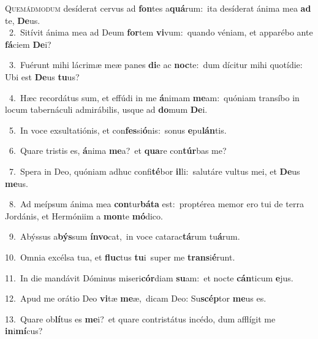 \lettrine{\initial\textcolor{\initialcolor}{Q}}{uemádmodum} desíderat cervus ad \textbf{fon}\-tes a\-\textbf{quá}\-rum:~\star ita desíderat ánima mea \textbf{ad} te, \textbf{De}\-us.\\
{\numbfont\textcolor{\numbcolor}{~2.}}~Sitívit ánima mea ad Deum \textbf{for}\-tem \textbf{vi}\-vum:~\star quando véniam, et apparébo ante \textbf{fá}\-ciem \textbf{De}\-i?\par
{\numbfont\textcolor{\numbcolor}{~3.}}~Fuérunt mihi lácrimæ meæ panes \textbf{di}\-e ac \textbf{noc}\-te:~\star dum dícitur mihi quotídie: Ubi est \textbf{De}\-us \textbf{tu}\-us?\par
{\numbfont\textcolor{\numbcolor}{~4.}}~Hæc recordátus sum, et effúdi in me \textbf{á}\-nimam \textbf{me}\-am:~\star quóniam transíbo in locum tabernáculi admirábilis, usque ad \textbf{do}\-mum \textbf{De}\-i.\par
{\numbfont\textcolor{\numbcolor}{~5.}}~In voce exsultatiónis, et con\-\textbf{fes}\-si\-\textbf{ó}\-nis:~\star sonus \textbf{e}\-pu\-\textbf{lán}\-tis.\par
{\numbfont\textcolor{\numbcolor}{~6.}}~Quare tristis es, \textbf{á}\-nima \textbf{me}\-a?~\star et \textbf{qua}\-re con\-\textbf{túr}\-bas me?\par
{\numbfont\textcolor{\numbcolor}{~7.}}~Spera in Deo, quóniam adhuc confi\-\textbf{té}\-bor \textbf{il}\-li:~\star salutáre vultus mei, et \textbf{De}\-us \textbf{me}\-us.\par
{\numbfont\textcolor{\numbcolor}{~8.}}~Ad meípsum ánima mea \textbf{con}\-tur\-\textbf{bá}\-\textbf{ta} est:~\star proptérea memor ero tui de terra Jordánis, et Hermóniim a \textbf{mon}\-te \textbf{mó}\-dico.\par
{\numbfont\textcolor{\numbcolor}{~9.}}~Abýssus a\-\textbf{býs}\-sum \textbf{ín}\-\textbf{vo}cat,~\star in voce catarac\-\textbf{tá}\-rum tu\-\textbf{á}\-rum.\par
{\numbfont\textcolor{\numbcolor}{10.}}~Omnia excélsa tua, et \textbf{fluc}\-tus \textbf{tu}\-i~\star super me \textbf{trans}\-i\-\textbf{é}\-runt.\par
{\numbfont\textcolor{\numbcolor}{11.}}~In die mandávit Dóminus miseri\-\textbf{cór}\-diam \textbf{su}\-am:~\star et nocte \textbf{cán}\-ticum \textbf{e}\-jus.\par
{\numbfont\textcolor{\numbcolor}{12.}}~Apud me orátio Deo \textbf{vi}\-tæ \textbf{me}\-æ,~\star dicam Deo: Su\-\textbf{scép}\-tor \textbf{me}\-us es.\par
{\numbfont\textcolor{\numbcolor}{13.}}~Quare ob\-\textbf{lí}\-tus es \textbf{me}\-i?~\star et quare contristátus incédo, dum afflígit me \textbf{in}\-i\-\textbf{mí}\-cus?\par
